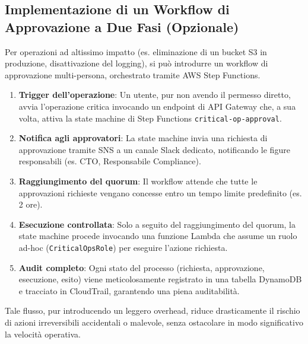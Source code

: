 \subsection{Implementazione di un Workflow di Approvazione a Due Fasi (Opzionale)}
\label{subsubsec:approvazione_due_fasi}
Per operazioni ad altissimo impatto (es. eliminazione di un bucket S3 in produzione, disattivazione del logging), si può introdurre un workflow di approvazione multi-persona, orchestrato tramite AWS Step Functions.

\begin{enumerate}
\item \textbf{Trigger dell'operazione}: Un utente, pur non avendo il permesso diretto, avvia l'operazione critica invocando un endpoint di API Gateway che, a sua volta, attiva la state machine di Step Functions \texttt{critical-op-approval}.
\item \textbf{Notifica agli approvatori}: La state machine invia una richiesta di approvazione tramite SNS a un canale Slack dedicato, notificando le figure responsabili (es. CTO, Responsabile Compliance).
\item \textbf{Raggiungimento del quorum}: Il workflow attende che tutte le approvazioni richieste vengano concesse entro un tempo limite predefinito (es. 2 ore).
\item \textbf{Esecuzione controllata}: Solo a seguito del raggiungimento del quorum, la state machine procede invocando una funzione Lambda che assume un ruolo ad-hoc (\texttt{CriticalOpsRole}) per eseguire l'azione richiesta.
\item \textbf{Audit completo}: Ogni stato del processo (richiesta, approvazione, esecuzione, esito) viene meticolosamente registrato in una tabella DynamoDB e tracciato in CloudTrail, garantendo una piena auditabilità.
\end{enumerate}

Tale flusso, pur introducendo un leggero overhead, riduce drasticamente il rischio di azioni irreversibili accidentali o malevole, senza ostacolare in modo significativo la velocità operativa.


